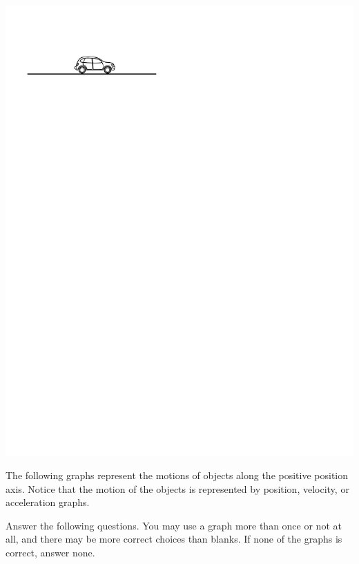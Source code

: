 \vspace{0.3cm}
{\par\centering \includegraphics{slowing/car_on_ground.pdf} \par}
\vspace{0.3cm}

\newpage

The following graphs represent the motions of objects along the positive position axis. Notice that the motion of the objects is represented by position, velocity, or acceleration graphs.

Answer the following questions. You may use a graph more than once or not at
all, and there may be more correct choices than blanks. If none of the graphs
is correct, answer none.


